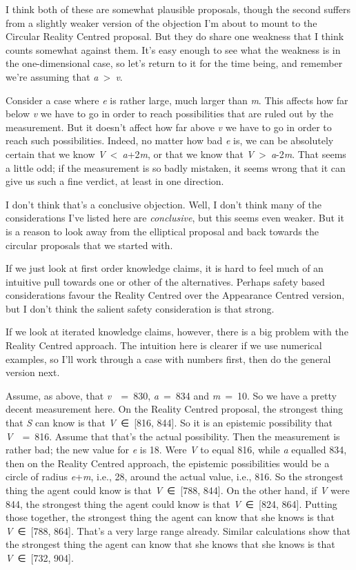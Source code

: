 \documentclass[
  10pt,
  letterpaper,
  DIV=11,
  numbers=noendperiod,
  twoside]{scrartcl}
\begin{document}
I think both of these are somewhat plausible proposals, though the
second suffers from a slightly weaker version of the objection I'm about
to mount to the Circular Reality Centred proposal. But they do share one
weakness that I think counts somewhat against them. It's easy enough to
see what the weakness is in the one-dimensional case, so let's return to
it for the time being, and remember we're assuming that
\emph{a}~\textgreater~\emph{v}.

Consider a case where \emph{e} is rather large, much larger than
\emph{m}. This affects how far below \emph{v} we have to go in order to
reach possibilities that are ruled out by the measurement. But it
doesn't affect how far above \emph{v} we have to go in order to reach
such possibilities. Indeed, no matter how bad \emph{e} is, we can be
absolutely certain that we know \emph{V}~\textless~\emph{a}+2\emph{m},
or that we know that \emph{V}~\textgreater~\emph{a}-2\emph{m}. That
seems a little odd; if the measurement is so badly mistaken, it seems
wrong that it can give us such a fine verdict, at least in one
direction.

I don't think that's a conclusive objection. Well, I don't think many of
the considerations I've listed here are \emph{conclusive}, but this
seems even weaker. But it is a reason to look away from the elliptical
proposal and back towards the circular proposals that we started with.

If we just look at first order knowledge claims, it is hard to feel much
of an intuitive pull towards one or other of the alternatives. Perhaps
safety based considerations favour the Reality Centred over the
Appearance Centred version, but I don't think the salient safety
consideration is that strong.

If we look at iterated knowledge claims, however, there is a big problem
with the Reality Centred approach. The intuition here is clearer if we
use numerical examples, so I'll work through a case with numbers first,
then do the general version next.

Assume, as above, that \emph{v}~~=~830, \emph{a}~=~834 and
\emph{m}~=~10. So we have a pretty decent measurement here. On the
Reality Centred proposal, the strongest thing that \emph{S} can know is
that \emph{V}~∈~{[}816, 844{]}. So it is an epistemic possibility that
\emph{V}~~=~816. Assume that that's the actual possibility. Then the
measurement is rather bad; the new value for \emph{e} is 18. Were
\emph{V} to equal 816, while \emph{a} equalled 834, then on the Reality
Centred approach, the epistemic possibilities would be a circle of
radius \emph{e}+\emph{m}, i.e., 28, around the actual value, i.e., 816.
So the strongest thing the agent could know is that \emph{V}~∈~{[}788,
844{]}. On the other hand, if \emph{V} were 844, the strongest thing the
agent could know is that \emph{V}~∈~{[}824, 864{]}. Putting those
together, the strongest thing the agent can know that she knows is that
\emph{V}~∈~{[}788, 864{]}. That's a very large range already. Similar
calculations show that the strongest thing the agent can know that she
knows that she knows is that \emph{V}~∈~{[}732, 904{]}.
\end{document}
